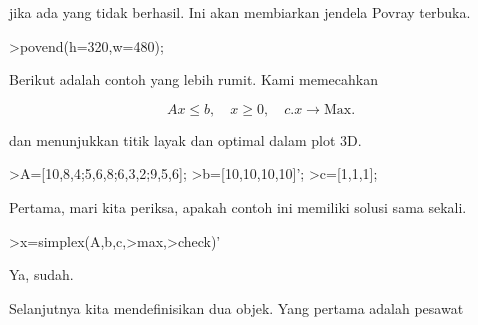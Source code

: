 \documentclass[a4paper,10pt]{article}
\begin{document}
\begin{eulernotebook}
\begin{eulercomment}
jika ada yang tidak berhasil. Ini akan membiarkan jendela Povray
terbuka.
\end{eulercomment}
\begin{eulerprompt}
>povend(h=320,w=480);
\end{eulerprompt}
\begin{eulercomment}
Berikut adalah contoh yang lebih rumit. Kami memecahkan

\end{eulercomment}
\begin{eulerformula}
\[
Ax \le b, \quad x \ge 0, \quad c.x \to \text{Max.}
\]
\end{eulerformula}
\begin{eulercomment}
dan menunjukkan titik layak dan optimal dalam plot 3D.
\end{eulercomment}
\begin{eulerprompt}
>A=[10,8,4;5,6,8;6,3,2;9,5,6];
>b=[10,10,10,10]';
>c=[1,1,1];
\end{eulerprompt}
\begin{eulercomment}
Pertama, mari kita periksa, apakah contoh ini memiliki solusi sama
sekali.
\end{eulercomment}
\begin{eulerprompt}
>x=simplex(A,b,c,>max,>check)'
\end{eulerprompt}
\begin{euleroutput}
  [0,  1,  0.5]
\end{euleroutput}
\begin{eulercomment}
Ya, sudah.

Selanjutnya kita mendefinisikan dua objek. Yang pertama adalah pesawat


\end{eulercomment}
\end{eulernotebook}
\end{document}
